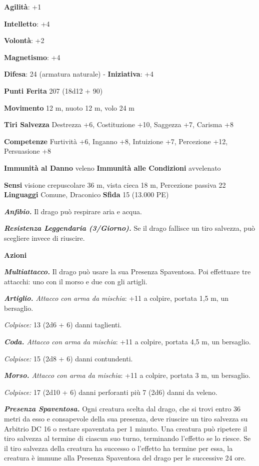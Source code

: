 \begin{multicols}{2}
\textbf{Agilità}: +1

\textbf{Intelletto}: +4

\textbf{Volontà}: +2

\textbf{Magnetismo}: +4

\textbf{Difesa}: 24 (armatura naturale) - \textbf{Iniziativa}: +4

\textbf{Punti Ferita} 207 (18d12 + 90)

\textbf{Movimento} 12 m, nuoto 12 m, volo 24 m

\textbf{Tiri Salvezza} Destrezza +6, Costituzione +10, Saggezza +7,
Carisma +8

\textbf{Competenze} Furtività +6, Inganno +8, Intuizione +7, Percezione
+12, Persuasione +8

\textbf{Immunità al Danno} veleno \textbf{Immunità alle Condizioni}
avvelenato

\textbf{Sensi} visione crepuscolare 36 m, vista cieca 18 m, Percezione passiva
22 \textbf{Linguaggi} Comune, Draconico \textbf{Sfida} 15 (13.000 PE)

\emph{\textbf{Anfibio.}} Il drago può respirare aria e acqua.

\emph{\textbf{Resistenza Leggendaria (3/Giorno).}} Se il drago fallisce
un tiro salvezza, può scegliere invece di riuscire.

\textbf{Azioni}

\emph{\textbf{Multiattacco.}} Il drago può usare la sua Presenza
Spaventosa. Poi effettuare tre attacchi: uno con il morso e due con gli
artigli.

\emph{\textbf{Artiglio.} Attacco con arma da mischia}: +11 a colpire,
portata 1,5 m, un bersaglio.

\emph{Colpisce:} 13 (2d6 + 6) danni taglienti.

\emph{\textbf{Coda.} Attacco con arma da mischia}: +11 a colpire,
portata 4,5 m, un bersaglio.

\emph{Colpisce:} 15 (2d8 + 6) danni contundenti.

\emph{\textbf{Morso.} Attacco con arma da mischia}: +11 a colpire,
portata 3 m, un bersaglio.

\emph{Colpisce:} 17 (2d10 + 6) danni perforanti più 7 (2d6) danni da
veleno.

\emph{\textbf{Presenza Spaventosa.}} Ogni creatura scelta dal drago, che
si trovi entro 36 metri da esso e consapevole della sua presenza, deve
riuscire un tiro salvezza su Arbitrio DC 16 o restare spaventata per 1
minuto. Una creatura può ripetere il tiro salvezza al termine di ciascun
suo turno, terminando l'effetto se lo riesce. Se il tiro salvezza della
creatura ha successo o l'effetto ha termine per essa, la creatura è
immune alla Presenza Spaventosa del drago per le successive 24 ore.


\end{multicols}
